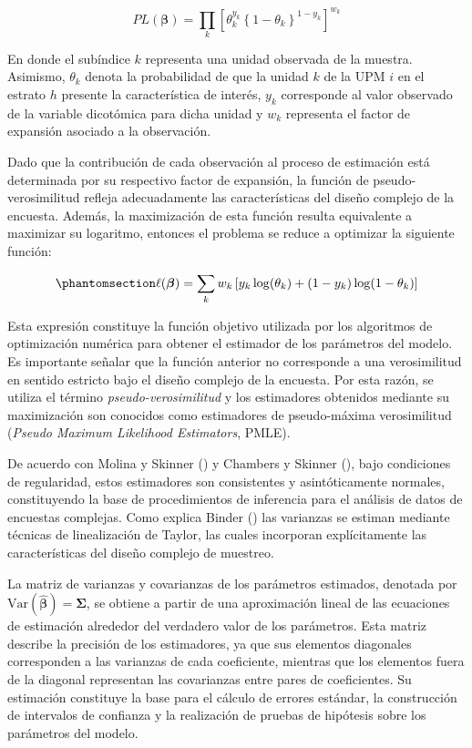 \documentclass[
  spanish,
  11pt,
  letterpaper,
  oneside,
  open=any]{scrbook}
\begin{document}
\[
PL(\boldsymbol{\beta})
=
\prod_{k}
\left[
\theta_{k}^{y_{k}}
\left\{
1-\theta_{k}
\right\}^{1-y_{k}}
\right]^{w_{k}}
\]

En donde el subíndice \(k\) representa una unidad observada de la
muestra. Asimismo, \(\theta_{k}\) denota la probabilidad de que la
unidad \(k\) de la UPM \(i\) en el estrato \(h\) presente la
característica de interés, \(y_{k}\) corresponde al valor observado de
la variable dicotómica para dicha unidad y \(w_{k}\) representa el
factor de expansión asociado a la observación.

Dado que la contribución de cada observación al proceso de estimación
está determinada por su respectivo factor de expansión, la función de
pseudo-verosimilitud refleja adecuadamente las características del
diseño complejo de la encuesta. Además, la maximización de esta función
resulta equivalente a maximizar su logaritmo, entonces el problema se
reduce a optimizar la siguiente función:

\begin{equation}\protect\phantomsection\label{eq-log-pseudoverosimilitud-logistica}{
\ell(\boldsymbol{\beta})
=
\sum_{k}
w_{k}
\left[
y_{k}\log(\theta_{k})
+
(1-y_{k})
\log(1-\theta_{k})
\right]
}\end{equation}

Esta expresión constituye la función objetivo utilizada por los
algoritmos de optimización numérica para obtener el estimador de los
parámetros del modelo. Es importante señalar que la función anterior no
corresponde a una verosimilitud en sentido estricto bajo el diseño
complejo de la encuesta. Por esta razón, se utiliza el término
\emph{pseudo-verosimilitud} y los estimadores obtenidos mediante su
maximización son conocidos como estimadores de pseudo-máxima
verosimilitud (\emph{Pseudo Maximum Likelihood Estimators}, PMLE).

De acuerdo con Molina y Skinner ()
y Chambers y Skinner (), bajo
condiciones de regularidad, estos estimadores son consistentes y
asintóticamente normales, constituyendo la base de procedimientos de
inferencia para el análisis de datos de encuestas complejas. Como
explica Binder () las varianzas
se estiman mediante técnicas de linealización de Taylor, las cuales
incorporan explícitamente las características del diseño complejo de
muestreo.

La matriz de varianzas y covarianzas de los parámetros estimados,
denotada por
\(\text{Var}(\hat{\boldsymbol{\beta}})=\boldsymbol{\Sigma}\), se obtiene
a partir de una aproximación lineal de las ecuaciones de estimación
alrededor del verdadero valor de los parámetros. Esta matriz describe la
precisión de los estimadores, ya que sus elementos diagonales
corresponden a las varianzas de cada coeficiente, mientras que los
elementos fuera de la diagonal representan las covarianzas entre pares
de coeficientes. Su estimación constituye la base para el cálculo de
errores estándar, la construcción de intervalos de confianza y la
realización de pruebas de hipótesis sobre los parámetros del modelo.
\end{document}

